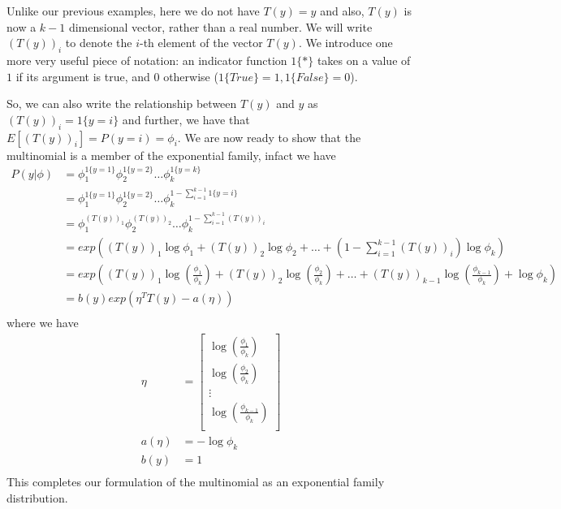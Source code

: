 Unlike our previous examples, here we do not have $T(y) = y$ and also, $T(y)$ is now a $k-1$ dimensional vector,
rather than a real number.\newline
We will write $(T(y))_i$ to denote the $i$-th element of the vector $T(y)$.\newline
We introduce one more very useful piece of notation: an indicator function $1\{*\}$ takes on a value of $1$
if its argument is true, and $0$ otherwise ($1\{True\} = 1, 1\{False\} = 0$).

So, we can also write the relationship between $T(y)$ and $y$ as $(T(y))_i = 1\{y=i\}$ and 
further, we have that $E[(T(y))_i] = P(y=i) = \phi_i$.\newline
We are now ready to show that the multinomial is a member of the exponential family, infact we have
\begin{align*}
    P(y | \phi) & = \phi _1^{1\{y=1\}} \phi_2^{1\{y=2\}} \dots \phi_k^{1\{y=k\}} \\
               & = \phi _1^{1\{y=1\}} \phi_2^{1\{y=2\}} \dots \phi_k^{1 - \sum _{i=1}^{k-1} 1\{y = i\}} \\
               & = \phi_1^{(T(y))_1} \phi_2^{(T(y))_2} \dots \phi_k^{1 - \sum _{i=1}^{k-1} (T(y))_i} \\
               & = exp \left((T(y))_1 \log \phi_1 + (T(y))_2 \log \phi_2 + \dots 
                             + (1 - \sum _{i=1}^{k-1} (T(y))_i) \log \phi_k \right) \\
               & = exp \left((T(y))_1 \log \left(\frac{\phi_1}{\phi_k}\right) + (T(y))_2 \log \left(\frac{\phi_2}
                   {\phi_k}\right) + \dots + (T(y))_{k-1} \log \left(\frac{\phi_{k-1}}{\phi_k}\right)
                   + \log \phi_k\right) \\
               & = b(y) exp(\eta^T T(y) - a(\eta)) \\
\end{align*}
where we have 
\begin{align*}
    \eta & = \begin{bmatrix}
                \log(\frac{\phi_1}{\phi_k}) \\
                \log(\frac{\phi_2}{\phi_k}) \\
                \vdots \\
                \log(\frac{\phi_{k-1}}{\phi_k}) \\
             \end{bmatrix} \\
    a(\eta) & = -\log \phi_k \\
    b(y) & = 1 \\
\end{align*}
This completes our formulation of the multinomial as an exponential family distribution.

